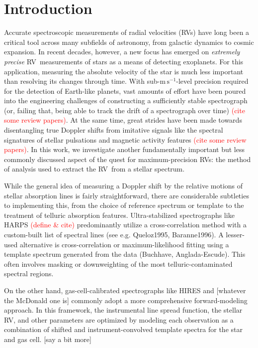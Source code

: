 \documentclass[modern]{aastex61}
\newcommand{\unit}[1]{\mathrm{#1}}
\newcommand{\m}{\unit{m}}
\newcommand{\s}{\unit{s}}
\newcommand{\ms}{\m\,\s^{-1}}
\newcommand\todo[1]{\textcolor{red}{#1}}  %
\newcommand{\acronym}[1]{{\small{#1}}}
\newcommand{\RV}{\acronym{RV}}
\begin{document}
\section{Introduction}

Accurate spectroscopic measurements of radial velocities (\RV s) have long been a critical tool across many subfields of astronomy, from galactic dynamics to cosmic expansion. In recent decades, however, a new focus has emerged on \textit{extremely precise} \RV\ measurements of stars as a means of detecting exoplanets. For this application, measuring the absolute velocity of the star is much less important than resolving its changes through time. With sub-$\ms$-level precision required for the detection of Earth-like planets, vast amounts of effort have been poured into the engineering challenges of constructing a sufficiently stable spectrograph (or, failing that, being able to track the drift of a spectrograph over time) \todo{(cite some review papers)}. At the same time, great strides have been made towards disentangling true Doppler shifts from imitative signals like the spectral signatures of stellar pulsations and magnetic activity features \todo{(cite some review papers)}.  In this work, we investigate another fundamentally important but less commonly discussed aspect of the quest for maximum-precision \RV s: the method of analysis used to extract the \RV\ from a stellar spectrum.

While the general idea of measuring a Doppler shift by the relative motions of stellar absorption lines is fairly straightforward, there are considerable subtleties to implementing this, from the choice of reference spectrum or template to the treatment of telluric absorption features. Ultra-stabilized spectrographs like HARPS \todo{(define \& cite)} predominantly utilize a cross-correlation method with a custom-built list of spectral lines (see e.g. Queloz1995, Baranne1996). A lesser-used alternative is cross-correlation or maximum-likelihood fitting using a template spectrum generated from the data (Buchhave, Anglada-Escude). This often involves masking or downweighting of the most telluric-contaminated spectral regions.

On the other hand, gas-cell-calibrated spectrographs like HIRES and [whatever the McDonald one is] commonly adopt a more comprehensive forward-modeling approach. In this framework, the instrumental line spread function, the stellar RV, and other parameters are optimized by modeling each observation as a combination of shifted and instrument-convolved template spectra for the star and gas cell. [say a bit more]
\end{document}

